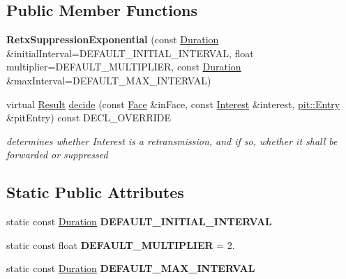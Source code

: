 \subsection*{Public Member Functions}
\begin{DoxyCompactItemize}
\item 
{\bfseries Retx\+Suppression\+Exponential} (const \hyperlink{classnfd_1_1fw_1_1RetxSuppressionExponential_a8bf25d84d9b6756133a9c0822e0a4f7b}{Duration} \&initial\+Interval=D\+E\+F\+A\+U\+L\+T\+\_\+\+I\+N\+I\+T\+I\+A\+L\+\_\+\+I\+N\+T\+E\+R\+V\+AL, float multiplier=D\+E\+F\+A\+U\+L\+T\+\_\+\+M\+U\+L\+T\+I\+P\+L\+I\+ER, const \hyperlink{classnfd_1_1fw_1_1RetxSuppressionExponential_a8bf25d84d9b6756133a9c0822e0a4f7b}{Duration} \&max\+Interval=D\+E\+F\+A\+U\+L\+T\+\_\+\+M\+A\+X\+\_\+\+I\+N\+T\+E\+R\+V\+AL)\hypertarget{classnfd_1_1fw_1_1RetxSuppressionExponential_a7db9fb5c4c5eb8f71c6cc9d71ed119a9}{}\label{classnfd_1_1fw_1_1RetxSuppressionExponential_a7db9fb5c4c5eb8f71c6cc9d71ed119a9}

\item 
virtual \hyperlink{classnfd_1_1fw_1_1RetxSuppression_af3180f6ce660253c6b415057b817af82}{Result} \hyperlink{classnfd_1_1fw_1_1RetxSuppressionExponential_a1ea5e8d165e47b74a4526027a054a06e}{decide} (const \hyperlink{classnfd_1_1Face}{Face} \&in\+Face, const \hyperlink{classndn_1_1Interest}{Interest} \&interest, \hyperlink{classnfd_1_1pit_1_1Entry}{pit\+::\+Entry} \&pit\+Entry) const D\+E\+C\+L\+\_\+\+O\+V\+E\+R\+R\+I\+DE\hypertarget{classnfd_1_1fw_1_1RetxSuppressionExponential_a1ea5e8d165e47b74a4526027a054a06e}{}\label{classnfd_1_1fw_1_1RetxSuppressionExponential_a1ea5e8d165e47b74a4526027a054a06e}

\begin{DoxyCompactList}\small\item\em determines whether Interest is a retransmission, and if so, whether it shall be forwarded or suppressed \end{DoxyCompactList}\end{DoxyCompactItemize}
\subsection*{Static Public Attributes}
\begin{DoxyCompactItemize}
\item 
static const \hyperlink{classnfd_1_1fw_1_1RetxSuppressionExponential_a8bf25d84d9b6756133a9c0822e0a4f7b}{Duration} {\bfseries D\+E\+F\+A\+U\+L\+T\+\_\+\+I\+N\+I\+T\+I\+A\+L\+\_\+\+I\+N\+T\+E\+R\+V\+AL}
\item 
static const float {\bfseries D\+E\+F\+A\+U\+L\+T\+\_\+\+M\+U\+L\+T\+I\+P\+L\+I\+ER} = 2.\hypertarget{classnfd_1_1fw_1_1RetxSuppressionExponential_a5b7b79198c59a056dfe8a0ed46ae4201}{}\label{classnfd_1_1fw_1_1RetxSuppressionExponential_a5b7b79198c59a056dfe8a0ed46ae4201}

\item 
static const \hyperlink{classnfd_1_1fw_1_1RetxSuppressionExponential_a8bf25d84d9b6756133a9c0822e0a4f7b}{Duration} {\bfseries D\+E\+F\+A\+U\+L\+T\+\_\+\+M\+A\+X\+\_\+\+I\+N\+T\+E\+R\+V\+AL}
\end{DoxyCompactItemize}
